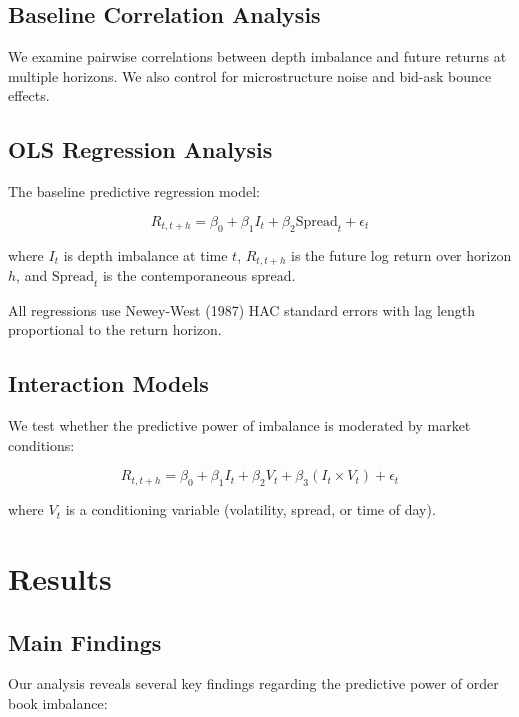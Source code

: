 \documentclass[12pt,a4paper]{article}
\begin{document}
\subsection{Baseline Correlation Analysis}

We examine pairwise correlations between depth imbalance and future returns at multiple horizons. We also control for microstructure noise and bid-ask bounce effects.

\subsection{OLS Regression Analysis}

The baseline predictive regression model:

\begin{equation}
R_{t,t+h} = \beta_0 + \beta_1 I_t + \beta_2 \text{Spread}_t + \epsilon_t
\end{equation}

where $I_t$ is depth imbalance at time $t$, $R_{t,t+h}$ is the future log return over horizon $h$, and $\text{Spread}_t$ is the contemporaneous spread.

All regressions use Newey-West (1987) HAC standard errors with lag length proportional to the return horizon.

\subsection{Interaction Models}

We test whether the predictive power of imbalance is moderated by market conditions:

\begin{equation}
R_{t,t+h} = \beta_0 + \beta_1 I_t + \beta_2 V_t + \beta_3 (I_t \times V_t) + \epsilon_t
\end{equation}

where $V_t$ is a conditioning variable (volatility, spread, or time of day).

\section{Results}

\subsection{Main Findings}

Our analysis reveals several key findings regarding the predictive power of order book imbalance:
\end{document}
